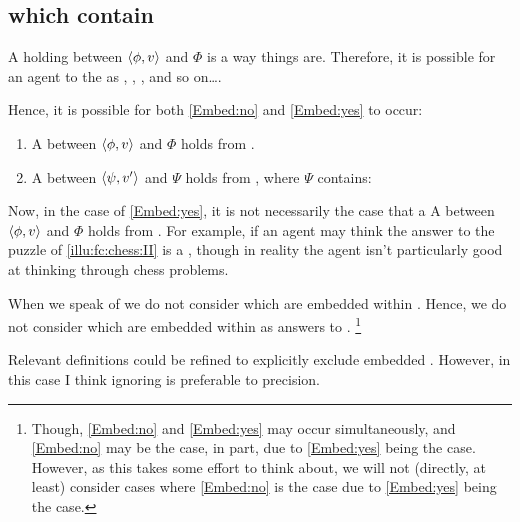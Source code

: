 \subsection*{ which contain }


\begin{note}
  A \ros{} holding between \(\langle\phi, v\rangle\) and \(\Phi\) is a way things are.
  Therefore, it is possible for an agent to \eval{} the \prop{}  as , , , and so on\dots.

  Hence, it is possible for both \ref{Embed:no} and \ref{Embed:yes} to occur:

  \begin{enumerate}[label=\arabic*., ref=(\arabic*)]
  \item
    \label{Embed:no}
    A  between \(\langle\phi, v\rangle\) and \(\Phi\) holds from .
  \item
    \label{Embed:yes}
    A  between \(\langle\psi, v'\rangle\) and \(\Psi\) holds from , where \(\Psi\) contains:

  \end{enumerate}

  Now, in the case of \ref{Embed:yes}, it is not necessarily the case that a A  between \(\langle\phi, v\rangle\) and \(\Phi\) holds from .
  For example, if an agent may think the answer to the puzzle of \autoref{illu:fc:chess:II} is a \fc{}, though in reality the agent isn't particularly good at thinking through chess problems.

  When we speak of \ros{} we do not consider \ros{} which are embedded within \ros{}.
  Hence, we do not consider \ros{} which are embedded within \ros{} as answers to \qWhy{}.%
  \footnote{
    Though, \ref{Embed:no} and \ref{Embed:yes} may occur simultaneously, and \ref{Embed:no} may be the case, in part, due to \ref{Embed:yes} being the case.
    However, as this takes some effort to think about, we will not (directly, at least) consider cases where \ref{Embed:no} is the case due to \ref{Embed:yes} being the case.
  }

  Relevant definitions could be refined to explicitly exclude embedded .
  However, in this case I think ignoring is preferable to precision.
\end{note}






